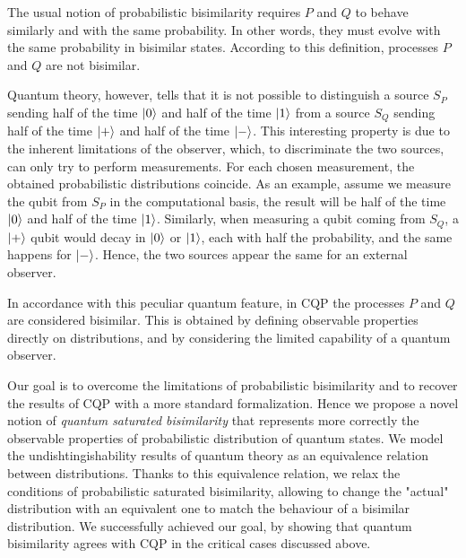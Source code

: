 The usual notion of  probabilistic bisimilarity requires $P$ and $Q$ to behave similarly and with the same probability. In other words, they must evolve with the same probability in bisimilar states. According to this definition, processes $P$ and $Q$ are not bisimilar.

Quantum theory, however, tells that it is not possible to distinguish a source $S_P$ sending half of the time $\ket{0}$ and half of the time $\ket{1}$ from a source $S_Q$ sending half of the time $\ket{+}$ and half of the time $\ket{-}$. This interesting property is due to the inherent limitations of the observer, which, to discriminate the two sources, can only try to perform measurements. For each chosen measurement, the obtained probabilistic distributions coincide. As an example, assume we measure the qubit from $S_P$ in the computational basis, the result will be half of the time $\ket{0}$ and half of the time $\ket{1}$. Similarly, when measuring a qubit coming from $S_Q$, a $\ket{+}$ qubit would decay in $\ket{0}$ or $\ket{1}$, each with half the probability, and the same happens for $\ket{-}$. Hence, the two sources appear the same for an external observer.
 
In accordance with this peculiar quantum feature, in CQP the processes $P$ and $Q$ are considered bisimilar. This is obtained by
defining observable properties directly on distributions, and by considering the limited capability of a quantum observer.

Our goal is to overcome the limitations of probabilistic bisimilarity and to recover the results of CQP with a more standard formalization. Hence we propose a novel notion of \textit{quantum saturated bisimilarity} that represents more correctly the observable properties of probabilistic distribution of quantum states. We model the undishtingishability results of quantum theory as an equivalence relation between distributions.  
Thanks to this equivalence relation, we relax the conditions of probabilistic saturated bisimilarity, allowing to change the "actual" distribution with an equivalent one to match the behaviour of a bisimilar distribution.
 We successfully achieved our goal, by showing that quantum bisimilarity agrees with CQP in the critical cases discussed above.
 
